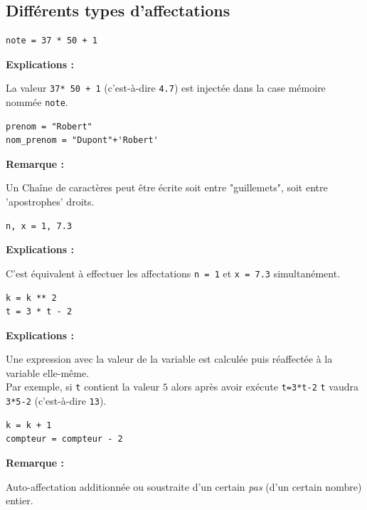 \documentclass[11pt, a4paper]{book}
\begin{document}
\subsection{Différents types d’affectations}

\begin{myexamples}
	\begin{lstlisting}[numbers=none]
note = 37 * 50 + 1
	\end{lstlisting}
	\textbf{Explications :}
	\begin{minipage}[t]{0.83\linewidth}
		La valeur \lstinline{37* 50 + 1} (c'est-à-dire \lstinline{4.7}) est injectée dans la case mémoire nommée \lstinline{note}.
	\end{minipage}	
	
	\begin{lstlisting}[numbers=none]
prenom = "Robert"
nom_prenom = "Dupont"+'Robert'
	\end{lstlisting}
	\textbf{Remarque :}
	\begin{minipage}[t]{0.85\linewidth}
		Un Chaîne de caractères peut être écrite soit entre "guillemets", soit entre 'apostrophes' droits.
	\end{minipage}
	
	
	\begin{lstlisting}[numbers=none]
n, x = 1, 7.3
	\end{lstlisting}
	\textbf{Explications :}
	\begin{minipage}[t]{0.83\linewidth}
		C'est équivalent à effectuer les affectations \lstinline{n = 1} et  \lstinline{x = 7.3} simultanément.
	\end{minipage}	
	
	
	\begin{lstlisting}[numbers=none]
k = k ** 2
t = 3 * t - 2
	\end{lstlisting}
	\textbf{Explications :}
	\begin{minipage}[t]{0.83\linewidth}
		Une expression avec la valeur de la variable est calculée puis réaffectée à la variable elle-même.\\
		Par exemple, si \lstinline{t} contient la valeur $5$ alors après avoir exécute \lstinline{t=3*t-2} \lstinline{t} vaudra  \lstinline{3*5-2} (c'est-à-dire \lstinline{13}). 
	\end{minipage}
	
	
	
	\begin{lstlisting}[numbers=none]
k = k + 1
compteur = compteur - 2
	\end{lstlisting}
	\textbf{Remarque :}
	\begin{minipage}[t]{0.85\linewidth}
		Auto-affectation additionnée ou soustraite d’un certain \textit{pas} (d’un certain nombre) entier.
	\end{minipage}
\end{myexamples}
\end{document}
